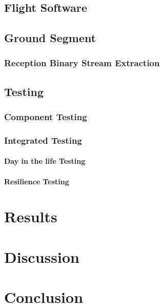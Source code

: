 \section{Flight Software}

\section{Ground Segment}

\subsection{Reception Binary Stream Extraction}

\section{Testing}

\subsection{Component Testing}

\subsection{Integrated Testing}

\subsubsection{Day in the life Testing}

\subsubsection{Resilience Testing}

\newpage
\chapter{Results}
\label{ch:reults}

\newpage
\chapter{Discussion}
\label{ch:discussion}

\newpage
\chapter{Conclusion}
\label{ch:conclusion}


\newpage
\printbibliography[heading=bibnumbered]  

